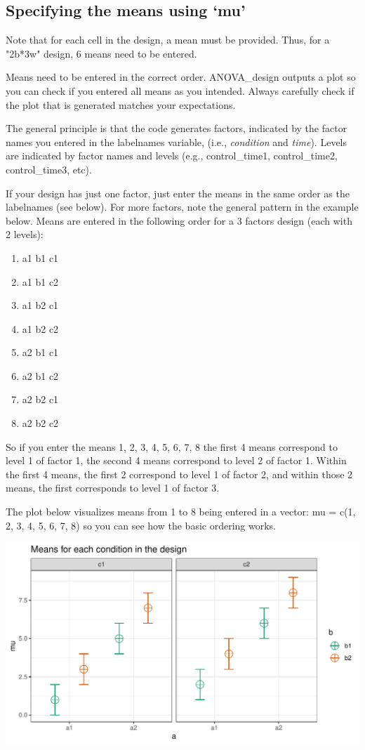 \documentclass[]{book}
\providecommand{\tightlist}{%
  \setlength{\itemsep}{0pt}\setlength{\parskip}{0pt}}
\begin{document}
\hypertarget{specifying-the-means-using-mu}{%
\subsection{Specifying the means using `mu'}\label{specifying-the-means-using-mu}}

Note that for each cell in the design, a mean must be provided. Thus, for a "2b*3w" design, 6 means need to be entered.

Means need to be entered in the correct order. ANOVA\_design outputs a plot so you can check if you entered all means as you intended. Always carefully check if the plot that is generated matches your expectations.

The general principle is that the code generates factors, indicated by the factor names you entered in the labelnames variable, (i.e., \emph{condition} and \emph{time}). Levels are indicated by factor names and levels (e.g., control\_time1, control\_time2, control\_time3, etc).

If your design has just one factor, just enter the means in the same order as the labelnames (see below). For more factors, note the general pattern in the example below. Means are entered in the following order for a 3 factors design (each with 2 levels):

\begin{enumerate}
\def\labelenumi{\arabic{enumi}.}
\tightlist
\item
  a1 b1 c1
\item
  a1 b1 c2
\item
  a1 b2 c1
\item
  a1 b2 c2
\item
  a2 b1 c1
\item
  a2 b1 c2
\item
  a2 b2 c1
\item
  a2 b2 c2
\end{enumerate}

So if you enter the means 1, 2, 3, 4, 5, 6, 7, 8 the first 4 means correspond to level 1 of factor 1, the second 4 means correspond to level 2 of factor 1. Within the first 4 means, the first 2 correspond to level 1 of factor 2, and within those 2 means, the first corresponds to level 1 of factor 3.

The plot below visualizes means from 1 to 8 being entered in a vector: mu = c(1, 2, 3, 4, 5, 6, 7, 8) so you can see how the basic ordering works.

\includegraphics{SuperpowerValidation_files/figure-latex/unnamed-chunk-2-1.pdf}
\end{document}
